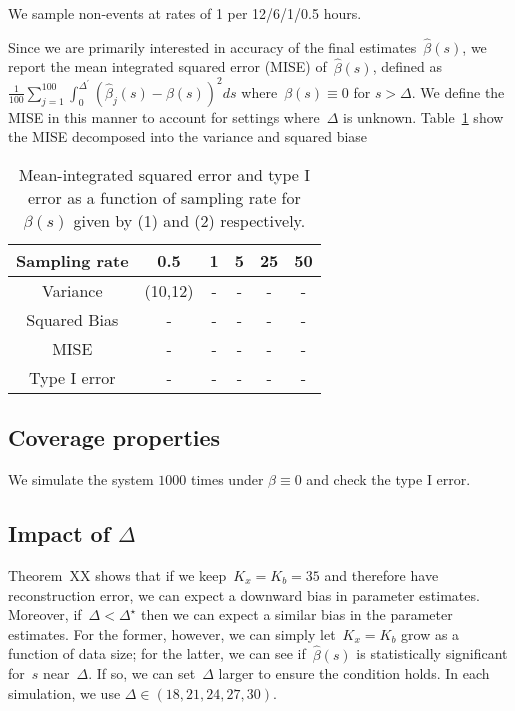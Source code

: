 \documentclass[12pt]{amsart}
\begin{document}
We sample non-events at rates of 1 per 12/6/1/0.5 hours.

Since we are primarily interested in accuracy of the final estimates~$\hat \beta(s)$, we report the mean integrated squared error (MISE) of~$\hat \beta (s)$, defined as~$\frac{1}{100} \sum_{j=1}^{100} \int_{0}^{\Delta^\prime} ( \hat \beta_j (s) - \beta(s))^2 ds$ where~$\beta(s) \equiv 0$ for $s > \Delta$.  We define the MISE in this manner to account for settings where~$\Delta$ is unknown. Table~\ref{tab:mise} show the MISE decomposed into the variance and squared biase

\begin{table}[!th]
\begin{tabular}{c | c c c c c}
Sampling rate & 0.5 & 1 & 5 & 25 & 50 \\ \hline
Variance & (10,12) & - & - & - & - \\
Squared Bias & - & - & - & - & -  \\
MISE & - & - & - & - & -  \\ \hline
Type I error & - & - & - & - & -  \\ \hline
\end{tabular}
\caption{Mean-integrated squared error and type I error as a function of sampling rate for $\beta(s)$ given by (1) and (2) respectively.}
\label{tab:mise}
\end{table}

\subsection{Coverage properties}

We simulate the system $1000$ times under $\beta \equiv 0$ and check the type I error.

\subsection{Impact of $\Delta$}

Theorem~XX shows that if we keep~$K_x = K_b = 35$ and therefore have reconstruction error, we can expect a downward bias in parameter estimates. Moreover, if~$\Delta < \Delta^\star$ then we can expect a similar bias in the parameter estimates.  For the former, however, we can simply let~$K_x = K_b$ grow as a function of data size; for the latter, we can see if~$\hat \beta(s)$ is statistically significant for~$s$ near~$\Delta$. If so, we can set~$\Delta$ larger to ensure the condition holds.  In each simulation, we use $\Delta \in (18,21,24,27,30)$.
\end{document}
